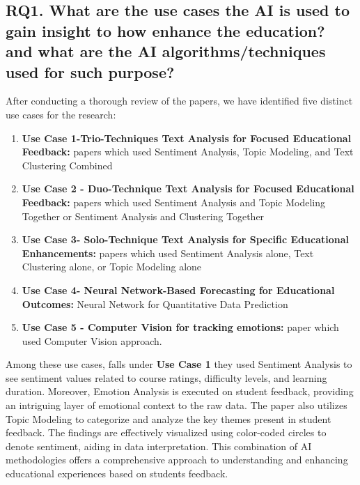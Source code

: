 \documentclass{svproc}
\begin{document}
\subsection{\textbf{RQ1.  What are the use cases the AI is used to gain insight to how enhance the education? and what are the AI algorithms/techniques used for such purpose?}} \label{RQ1_analysis}


\begin{flushleft}
After conducting a thorough review of the papers, we have identified five distinct use cases for the research:
\end{flushleft}

\begin{enumerate}
\item \textbf{Use Case 1-Trio-Techniques Text Analysis for Focused Educational Feedback:} papers which used Sentiment Analysis, Topic Modeling, and Text Clustering Combined
\item \textbf{Use Case 2 - Duo-Technique Text Analysis for Focused Educational Feedback:} papers which used Sentiment Analysis and Topic Modeling Together or Sentiment Analysis and Clustering Together
\item \textbf{Use Case 3- Solo-Technique Text Analysis for Specific Educational Enhancements: }papers which used Sentiment Analysis alone, Text Clustering alone, or Topic Modeling alone
\item \textbf{Use Case 4- Neural Network-Based Forecasting for Educational Outcomes:} Neural Network for Quantitative Data Prediction
\item \textbf{Use Case 5 - Computer Vision for tracking emotions:} paper which used Computer Vision approach. 
\end{enumerate}

Among these use cases, \cite{Palaute:_An_Online_Text_Mining_Tool_for_Analyzing_Written_Student_Course_Feedback} falls under \textbf{Use Case 1} they used Sentiment Analysis  to see sentiment values related to course ratings, difficulty levels, and learning duration. Moreover, Emotion Analysis is executed on student feedback, providing an intriguing layer of emotional context to the raw data. The paper also utilizes Topic Modeling to categorize and analyze the key themes present in student feedback. The findings are effectively visualized using color-coded circles to denote sentiment, aiding in data interpretation. This combination of AI methodologies offers a comprehensive approach to understanding and enhancing educational experiences based on students feedback.
\end{document}
